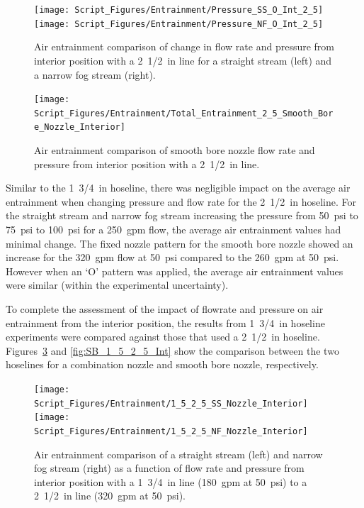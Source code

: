 \documentclass[12pt,oneside]{book}
\begin{document}
\begin{figure}[!ht]
\centering
\texttt{[image: Script\_Figures/Entrainment/Pressure\_SS\_O\_Int\_2\_5]}
\texttt{[image: Script\_Figures/Entrainment/Pressure\_NF\_O\_Int\_2\_5]}
\caption[Air Entrainment Comparison of Pressure and Flow Rate for Interior Combination Nozzle from 2~1/2~in Line]{Air entrainment comparison of change in flow rate and pressure from interior position with a 2~1/2~in line for a straight stream (left) and a narrow fog stream (right).}
\label{fig:SS_NF_FlowRate_Int_2_5}
\end{figure}

\begin{figure}[!ht]
\centering
\texttt{[image: Script\_Figures/Entrainment/Total\_Entrainment\_2\_5\_Smooth\_Bore\_Nozzle\_Interior]}
\caption[Air Entrainment Comparison of Exterior Smooth Bore Nozzle from 2~1/2~in Line]{Air entrainment comparison of smooth bore nozzle flow rate and pressure from interior position with a 2~1/2~in line.}
\label{fig:SB_Flowrate_Int_2_5}
\end{figure}

\vskip15pt
Similar to the 1~3/4~in hoseline, there was negligible impact on the average air entrainment when changing pressure and flow rate for the 2~1/2~in hoseline. For the straight stream and narrow fog stream increasing the pressure from 50~psi to 75~psi to 100~psi for a 250~gpm flow, the average air entrainment values had minimal change. The fixed nozzle pattern for the smooth bore nozzle showed an increase for the 320~gpm flow at 50~psi compared to the 260~gpm at 50~psi.  However when an `O' pattern was applied, the average air entrainment values were similar (within the experimental uncertainty).

To complete the assessment of the impact of flowrate and pressure on air entrainment from the interior position, the results from 1~3/4~in hoseline experiments were compared against those that used a 2~1/2~in hoseline. Figures~\ref{fig:SS_NF_1_5_2_5_Int} and \ref{fig:SB_1_5_2_5_Int} show the comparison between the two hoselines for a combination nozzle and smooth bore nozzle, respectively.

\begin{figure}[!ht]
\centering
\texttt{[image: Script\_Figures/Entrainment/1\_5\_2\_5\_SS\_Nozzle\_Interior]}
\texttt{[image: Script\_Figures/Entrainment/1\_5\_2\_5\_NF\_Nozzle\_Interior]}
\caption[Air Entrainment Comparison of Interior Smooth Bore Nozzle from 1~3/4~in Line to 2~1/2~in Line]{Air entrainment comparison of a straight stream (left) and narrow fog stream (right) as a function of flow rate and pressure from interior position with a 1~3/4~in line (180~gpm at 50~psi) to a 2~1/2~in line (320~gpm at 50~psi).}
\label{fig:SS_NF_1_5_2_5_Int}
\end{figure}
\end{document}
